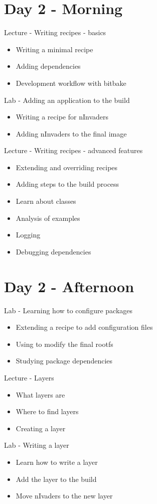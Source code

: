 \documentclass[a4paper,12pt,obeyspaces,spaces,hyphens]{article}
\begin{document}
\section{Day 2 - Morning}

\feagendatwocolumn
{Lecture - Writing recipes - basics}
{
  \begin{itemize}
  \item Writing a minimal recipe
  \item Adding dependencies
  \item Development workflow with bitbake
  \end{itemize}
}
{Lab - Adding an application to the build}
{
  \begin{itemize}
  \item Writing a recipe for nInvaders
  \item Adding nInvaders to the final image
  \end{itemize}
}

\feagendaonecolumn
{Lecture - Writing recipes - advanced features}
{
  \begin{itemize}
  \item Extending and overriding recipes
  \item Adding steps to the build process
  \item Learn about classes
  \item Analysis of examples
  \item Logging
  \item Debugging dependencies
  \end{itemize}
}

\section{Day 2 - Afternoon}

\feagendaonecolumn
{Lab - Learning how to configure packages}
{
  \begin{itemize}
  \item Extending a recipe to add configuration files
  \item Using  to modify the final rootfs
  \item Studying package dependencies
  \end{itemize}
}
\feagendatwocolumn
{Lecture - Layers}
{
  \begin{itemize}
  \item What layers are
  \item Where to find layers
  \item Creating a layer
  \end{itemize}
}
{Lab - Writing a layer}
{
  \begin{itemize}
  \item Learn how to write a layer
  \item Add the layer to the build
  \item Move nIvaders to the new layer
  \end{itemize}
}
\end{document}
